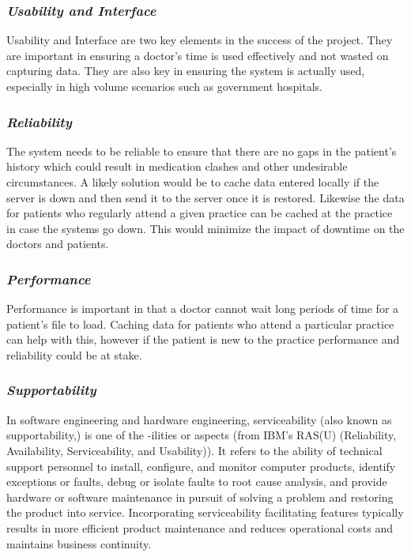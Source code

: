 \documentclass[a4paper]{article}
\begin{document}
	\subsubsection{\textit{Usability and Interface}}
	Usability and Interface are two key elements in the success of the project. They are important in ensuring a doctor's time is used effectively and not wasted on capturing data. They are also key in ensuring the system is actually used, especially in high volume scenarios such as government hospitals.
	
	\subsubsection{\textit{Reliability}}
	The system needs to be reliable to ensure that there are no gaps in the patient's history which could result in medication clashes and other undesirable circumstances. A likely solution would be to cache data entered locally if the server is down and then send it to the server once it is restored. Likewise the data for patients who regularly attend a given practice can be cached at the practice in case the systems go down. This would minimize the impact of downtime on the doctors and patients.
	
	\subsubsection{\textit{Performance}}
	Performance is important in that a doctor cannot wait long periods of time for a patient's file to load. Caching data for patients who attend a particular practice can help with this, however if the patient is new to the practice performance and reliability could be at stake.
	
	\subsubsection{\textit{Supportability}}
    
    In software engineering and hardware engineering, serviceability (also known as supportability,) is one of the -ilities or aspects (from IBM's RAS(U) (Reliability, Availability, Serviceability, and Usability)). It refers to the ability of technical support personnel to install, configure, and monitor computer products, identify exceptions or faults, debug or isolate faults to root cause analysis, and provide hardware or software maintenance in pursuit of solving a problem and restoring the product into service. Incorporating serviceability facilitating features typically results in more efficient product maintenance and reduces operational costs and maintains business continuity.
	
\end{document}
